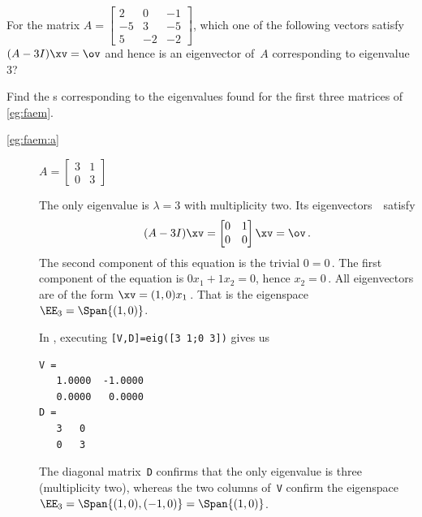 \begin{activity}
For the matrix \(A=\begin{bmatrix}2&0&-1
\\-5&3&-5
\\5&-2&-2\end{bmatrix}\), which one of the following vectors satisfy \((A-3I)\xv=\ov\) and hence is an eigenvector of~\(A\) corresponding to eigenvalue~\(3\)?
\end{activity}




\begin{example} \label{eg:faespm}
Find the s corresponding to the eigenvalues found for the first three matrices of \cref{eg:faem}.
\begin{description}
\item[\ref{eg:faem:a}]
\(A=\begin{bmatrix} 3&1\\0&3 \end{bmatrix}\)
\begin{solution} 
The only eigenvalue is \(\lambda=3\) with multiplicity two.
Its eigenvectors~\xv\ satisfy
\begin{equation*}
(A-3 I)\xv=\begin{bmatrix} 0&1\\0&0 \end{bmatrix}\xv=\ov\,.
\end{equation*}
The second component of this equation is the trivial \(0=0\)\,.  The first component of the equation is \(0x_1+1x_2=0\), hence \(x_2=0\)\,.
All eigenvectors are of the form \(\xv=(1,0)x_1\)\,.  
That is the eigenspace  \(\EE_3=\Span\{(1,0)\}\).

In \script, executing \verb|[V,D]=eig([3 1;0 3])| gives us
\begin{verbatim}
V =
   1.0000  -1.0000
   0.0000   0.0000
D =
   3   0
   0   3
\end{verbatim}
The diagonal matrix~\verb|D| confirms that the only eigenvalue is three (multiplicity two), whereas the two columns of~\verb|V| confirm the eigenspace \(\EE_3=\Span\{(1,0),(-1,0)\}=\Span\{(1,0)\}\).
\end{solution}



\end{description}
\end{example}
